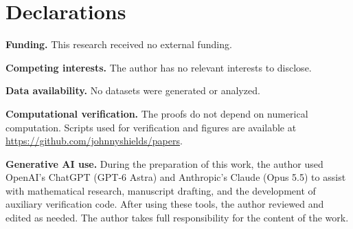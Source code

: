 \documentclass[11pt,a4paper]{amsart}
\numberwithin{equation}{section}
\theoremstyle{plain}
\theoremstyle{definition}
\begin{document}
\section*{Declarations}
{\footnotesize

\noindent\textbf{Funding.} This research received no external funding.

\smallskip
\noindent\textbf{Competing interests.} The author has no relevant interests to disclose.

\smallskip
\noindent\textbf{Data availability.} No datasets were generated or analyzed.

\smallskip
\noindent\textbf{Computational verification.} The proofs do not depend on numerical computation.  Scripts used for verification and figures are available at \url{https://github.com/johnnyshields/papers}.

\smallskip
\noindent\textbf{Generative AI use.} During the preparation of this work, the author used OpenAI's ChatGPT (GPT-6 Astra) and Anthropic's Claude (Opus 5.5) to assist with mathematical research, manuscript drafting, and the development of auxiliary verification code.  After using these tools, the author reviewed and edited as needed.  The author takes full responsibility for the content of the work.\par}
\end{document}
